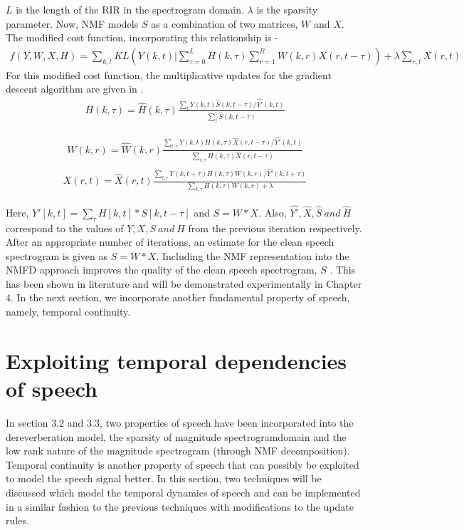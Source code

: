 \documentclass[12pt, a4paper, oneside]{book}
\begin{document}
$L$ is the length of the RIR in the spectrogram domain. $\lambda$ is the sparsity parameter. Now, NMF models $S$ as a combination of two matrices, $W$ and $X$. The modified cost function, incorporating this relationship is -
\begin{align}
f(Y,W,X,H) = \sum_{k,t} KL(Y(k,t)|\sum_{\tau = 0}^{L}H(k, \tau)\sum_{r =1}^{R}W(k,r)X(r,t-\tau)) + \lambda \sum_{r,t}X(r,t)
\end{align}
For this modified cost function, the multiplicative updates for the gradient descent algorithm are given in \cite{moham}.
\begin{align}H(k,\tau) = \hat{H}(k,\tau) \frac{\sum_{t}Y(k,t)\hat{S}(k,t - \tau)/\hat{Y'}(k,t)}{\sum_{t}\hat{S}(k,t - \tau)}
\end{align}

\begin{align}W(k,r) = \hat{W}(k,r) \frac{\sum_{t,\tau}Y(k,t)H(k,\tau)\hat{X}(r,t - \tau)/\hat{Y'}(k,t)}{\sum_{t,\tau}H(k,\tau)\hat{X}(r,t - \tau)}
\end{align}
\begin{align}X(r,t) = \hat{X}(r,t)\frac{\sum_{t,\tau}Y(k,t + \tau)H(k,\tau)W(k,r)/\hat{Y'}(k,t + \tau)}{\sum_{k,\tau}H(k,\tau)W(k,r) + \lambda}
\end{align}

Here,
$Y'[k,t] = \sum_{\tau}H[k,t]*S[k,t - \tau]$  and $S = W*X$. Also, $\hat{Y'}, \hat{X},\hat{S} \ and \  \hat{H}$ correspond to the values of $Y,X,S \ and \ H$ from the previous iteration respectively. 
After an appropriate number of iterations, an estimate for the clean speech spectrogram is given as $S = W*X$. 
Including the NMF representation into the NMFD approach improves the quality of the clean speech spectrogram, $S$ \cite{moham}. This has been shown in literature and will be demonstrated experimentally in Chapter 4. In the next section, we incorporate another fundamental property of speech, namely, temporal continuity. 
\section{Exploiting temporal dependencies of speech }
In section 3.2 and 3.3, two properties of speech have been incorporated into the dereverberation model, the sparsity of magnitude spectrogramdomain and the low rank nature of the magnitude spectrogram (through NMF decomposition). Temporal continuity is another property of speech that can possibly be exploited to model the speech signal better. In this section, two techniques will be discussed which model the temporal dynamics of speech and can be implemented in a similar fashion to the previous techniques with modifications to the update rules.
\end{document}
